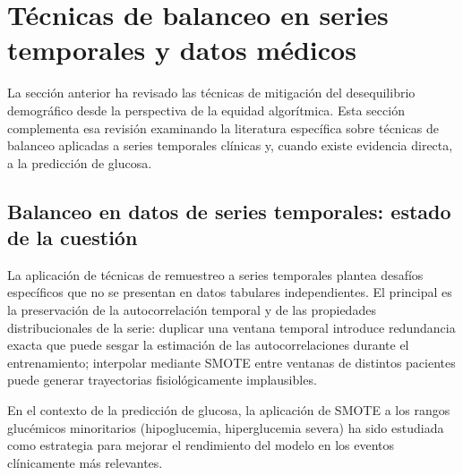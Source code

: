 \section{Técnicas de balanceo en series temporales y datos médicos}
\label{sec:tecnicas_balanceo_series_temporales}

La sección anterior ha revisado las técnicas de mitigación del desequilibrio demográfico desde la perspectiva de la equidad algorítmica. Esta sección complementa esa revisión examinando la literatura específica sobre técnicas de balanceo aplicadas a series temporales clínicas y, cuando existe evidencia directa, a la predicción de glucosa.

\subsection{Balanceo en datos de series temporales: estado de la cuestión}
\label{subsec:balanceo_series_temporales}

La aplicación de técnicas de remuestreo a series temporales plantea desafíos específicos que no se presentan en datos tabulares independientes. El principal es la preservación de la autocorrelación temporal y de las propiedades distribucionales de la serie: duplicar una ventana temporal introduce redundancia exacta que puede sesgar la estimación de las autocorrelaciones durante el entrenamiento; interpolar mediante SMOTE entre ventanas de distintos pacientes puede generar trayectorias fisiológicamente implausibles.

En el contexto de la predicción de glucosa, la aplicación de SMOTE a los rangos glucémicos minoritarios (hipoglucemia, hiperglucemia severa) ha sido estudiada como estrategia para mejorar el rendimiento del modelo en los eventos clínicamente más relevantes.

